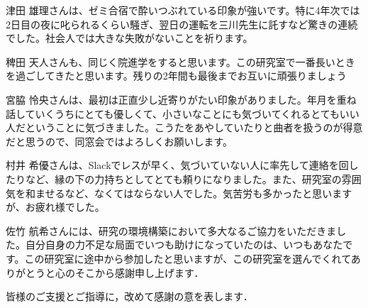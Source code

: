 津田 雄理さんは、ゼミ合宿で酔いつぶれている印象が強いです。特に4年次では2日目の夜に叱られるくらい騒ぎ、翌日の運転を三川先生に託すなど驚きの連続でした。社会人では大きな失敗がないことを祈ります。

稗田 天人さんも、同じく院進学をすると思います。この研究室で一番長いときを過ごしてきたと思います。残りの2年間も最後までお互いに頑張りましょう

宮脇 怜央さんは、最初は正直少し近寄りがたい印象がありました。年月を重ね話していくうちにとても優しくて、小さいなことにも気づいてくれるとてもいい人だということに気づきました。こうたをあやしていたりと曲者を扱うのが得意だと思うので、同窓会ではよろしくお願いします。

村井 希優さんは、Slackでレスが早く、気づいていない人に率先して連絡を回したりなど、縁の下の力持ちとしてとても頼りになりました。また、研究室の雰囲気を和ませるなど、なくてはならない人でした。気苦労も多かったと思いますが、お疲れ様でした。

佐竹 航希さんには、研究の環境構築において多大なるご協力をいただきました。自分自身の力不足な局面でいつも助けになっていたのは、いつもあなたです。この研究室に途中から参加したと思いますが、この研究室を選んでくれてありがとうと心のそこから感謝申し上げます．

皆様のご支援とご指導に，改めて感謝の意を表します．
